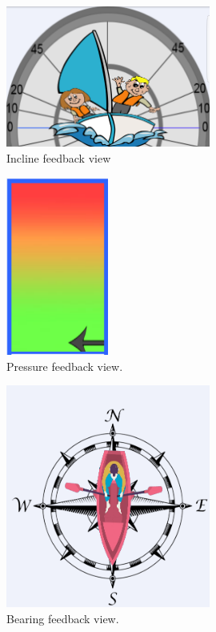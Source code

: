\begin{figure}[H] 
\centering
\includegraphics[width=0.6\textwidth]{Figures/incline.png}
\caption{Incline feedback view}
\label{feedback-incline}
\end{figure}
\begin{figure}[H]
\centering
\includegraphics[width=0.3\textwidth]{Figures/pressure.png}
\caption{Pressure feedback view.}
\label{feedback-pressure}
\end{figure}
\begin{figure}[H]
\centering
\includegraphics[width=0.6\textwidth]{Figures/compass.png}
\caption{Bearing feedback view.}
\label{feedback-compass}
\end{figure}
